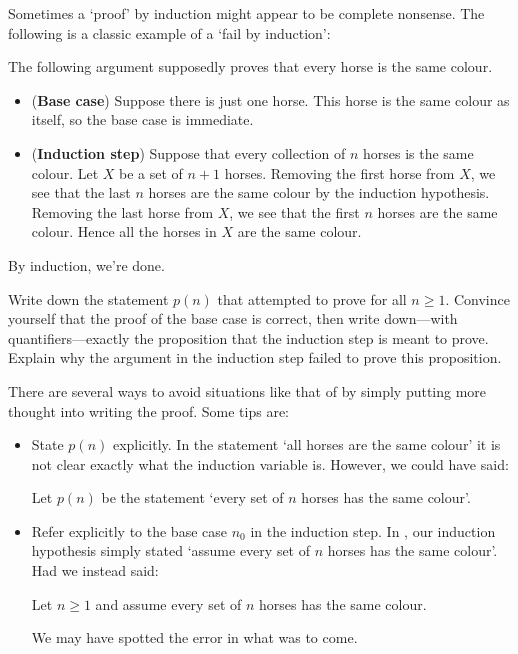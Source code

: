 Sometimes a `proof' by induction might appear to be complete nonsense. The following is a classic example of a `fail by induction':

\begin{example}
\label{exHorseInductionFail}
The following argument supposedly proves that every horse is the same colour.
\begin{itemize}
\item (\textbf{Base case}) Suppose there is just one horse. This horse is the same colour as itself, so the base case is immediate.
\item (\textbf{Induction step}) Suppose that every collection of $n$ horses is the same colour. Let $X$ be a set of $n+1$ horses. Removing the first horse from $X$, we see that the last $n$ horses are the same colour by the induction hypothesis. Removing the last horse from $X$, we see that the first $n$ horses are the same colour. Hence all the horses in $X$ are the same colour.
\end{itemize}
By induction, we're done.
\end{example}

\begin{exercise}
Write down the statement $p(n)$ that  attempted to prove for all $n \ge 1$. Convince yourself that the proof of the base case is correct, then write down---with quantifiers---exactly the proposition that the induction step is meant to prove. Explain why the argument in the induction step failed to prove this proposition.
\end{exercise}

There are several ways to avoid situations like that of  by simply putting more thought into writing the proof. Some tips are:

\begin{itemize}
\item State $p(n)$ explicitly. In the statement `all horses are the same colour' it is not clear exactly what the induction variable is. However, we could have said:
\begin{center}
Let $p(n)$ be the statement `every set of $n$ horses has the same colour'.
\end{center}

\item Refer explicitly to the base case $n_0$ in the induction step. In , our induction hypothesis simply stated `assume every set of $n$ horses has the same colour'. Had we instead said:
\begin{center}
Let $n \ge 1$ and assume every set of $n$ horses has the same colour.
\end{center}
We may have spotted the error in what was to come.
\end{itemize}

